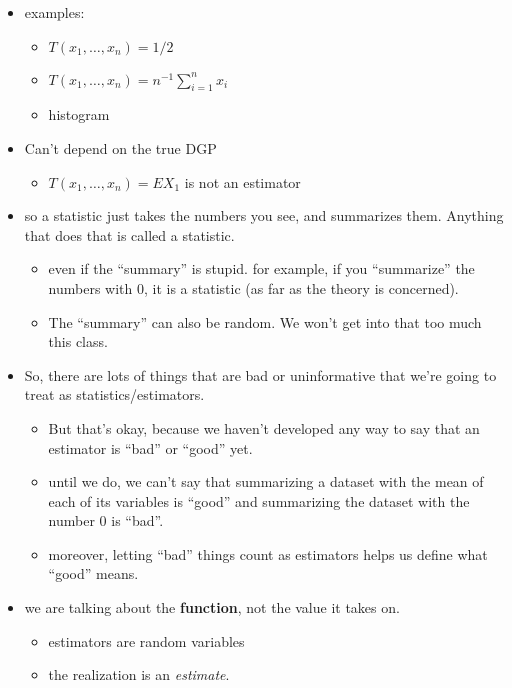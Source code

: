\begin{itemize}
\item examples:
\begin{itemize}
\item $T(x_1,\dots,x_n) = 1/2$
\item $T(x_1,\dots,x_n) = n^{-1} \sum_{i=1}^n x_i$
\item histogram
\end{itemize}
\item Can't depend on the true DGP
\begin{itemize}
\item $T(x_1,\dots,x_n) = E X_1$ is not an estimator
\end{itemize}
\item so a statistic just takes the numbers you see, and summarizes
      them.  Anything that does that is called a statistic.
\begin{itemize}
\item even if the ``summary'' is stupid.  for example, if you
        ``summarize'' the numbers with 0, it is a statistic (as far as the
        theory is concerned).
\item The ``summary'' can also be random.  We won't get into that too
        much this class.
\end{itemize}
\item So, there are lots of things that are bad or uninformative that
      we're going to treat as statistics/estimators.
\begin{itemize}
\item But that's okay, because we haven't developed any way to say
        that an estimator is ``bad'' or ``good'' yet.
\item until we do, we can't say that summarizing a dataset with the
        mean of each of its variables is ``good'' and summarizing the
        dataset with the number 0 is ``bad''.
\item moreover, letting ``bad'' things count as estimators helps us
        define what ``good'' means.
\end{itemize}
\item we are talking about the \textbf{function}, not the value it takes on.
\begin{itemize}
\item estimators are random variables
\item the realization is an \emph{estimate}.
\end{itemize}
\end{itemize}

